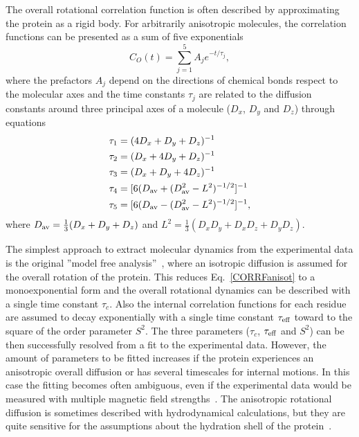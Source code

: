 \documentclass[journal=jpcbfk,manuscript=article]{achemso}
\begin{document}
The overall rotational correlation function is often described
by approximating the protein as a rigid body.
For arbitrarily anisotropic molecules, the correlation functions
can  be presented as a sum of five exponentials~\cite{woessner62,korzhnev01}
\begin{equation}\label{CORRFanisot}
  C_O(t)=\sum_{j=1}^5 A_j e^{-t/\tau_j},
\end{equation}
where the prefactors $A_j$ depend on the directions of chemical bonds 
respect to the molecular axes \cite{woessner62,luginbuhl97} and
the time constants $\tau_j$ are related 
to the diffusion constants around
three principal axes of a molecule
($D_{x}$, $D_{y}$ and $D_{z}$) through equations~\cite{woessner62,korzhnev01}
\begin{equation}\label{tauDIFFeq}
  \begin{split}
  \tau_1&=(4D_{x}+D_{y}+D_{z})^{-1} \\
  \tau_2&=(D_{x}+4D_{y}+D_{z})^{-1} \\
  \tau_3&=(D_{x}+D_{y}+4D_{z})^{-1} \\
  \tau_4&=[6(D_{\rm av}+(D_{\rm av}^2-L^2)^{-1/2}]^{-1} \\
  \tau_5&=[6(D_{\rm av}-(D_{\rm av}^2-L^2)^{-1/2}]^{-1}, \\
  \end{split}
\end{equation}
where $D_{\rm av}=\frac{1}{3}(D_{x}+D_{y}+D_{z})$ and 
$L^2=\frac{1}{3}(D_{x}D_{y}+D_{x}D_{z}+D_{y}D_{z})$.

The simplest approach to extract molecular dynamics from the experimental
data is the original ''model free analysis''~\cite{Lipari82},
where an isotropic diffusion is assumed for the overall rotation of the protein.
This reduces Eq.~\ref{CORRFanisot} to a monoexponential form and the overall rotational
dynamics can be described with a single time constant $\tau_c$.
Also the internal correlation functions for each residue are assumed
to decay exponentially with a single time constant $\tau_{\rm eff}$
toward to the square of the order parameter $S^2$. The three parameters
($\tau_c$, $\tau_{\rm eff}$ and $S^2$) can be then successfully resolved from a
fit to the experimental data.
However, the amount of parameters to be fitted increases if the protein
experiences an anisotropic overall diffusion or has several timescales for internal motions.
In this case the fitting becomes often ambiguous, even if the experimental data
would be measured with multiple magnetic field strengths~\cite{dosset00,luginbuhl97,jarymowycz06}.
The anisotropic rotational diffusion is sometimes described with hydrodynamical
calculations, but they are quite sensitive for the assumptions about the
hydration shell of the protein~\cite{torre00}.
\end{document}
